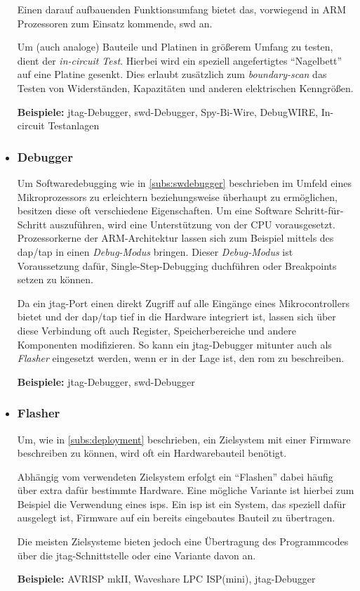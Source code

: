 \begin{itemize}
  Einen darauf aufbauenden Funktionsumfang bietet das, vorwiegend in ARM
  Prozessoren zum Einsatz kommende, \gls{swd}\cite{SWD} an.
  
  Um (auch analoge) Bauteile und Platinen in größerem Umfang zu testen, dient
  der \emph{in-circuit Test}. Hierbei wird ein speziell angefertigtes
  "`Nagelbett"' auf eine Platine gesenkt. Dies erlaubt zusätzlich zum
  \emph{boundary-scan} das Testen von Widerständen, Kapazitäten und anderen
  elektrischen Kenngrößen.
   
  \textbf{Beispiele:} \gls{jtag}-Debugger, \gls{swd}-Debugger, Spy-Bi-Wire,
  DebugWIRE, In-circuit Testanlagen
  \item \subsubsection*{Debugger}\label{subs:hwdebugger}  Um
  Softwaredebugging wie in \autoref{subs:swdebugger} beschrieben im Umfeld eines
  Mikroprozessors zu erleichtern beziehungsweise überhaupt zu ermöglichen,
  besitzen diese oft verschiedene Eigenschaften.
  Um eine Software Schritt-für-Schritt auszuführen, wird eine Unterstützung von
  der CPU vorausgesetzt. Prozessorkerne der ARM-Architektur lassen sich
  zum Beispiel mittels des \gls{dap}/\gls{tap} in einen \emph{Debug-Modus}
  bringen. Dieser \emph{Debug-Modus} ist Voraussetzung dafür,
  Single-Step-Debugging duchführen oder Breakpoints setzen zu können.
  
  Da ein \gls{jtag}-Port einen direkt Zugriff auf alle Eingänge eines
  Mikrocontrollers bietet und der \gls{dap}/\gls{tap} tief in die Hardware
  integriert ist, lassen sich über diese Verbindung oft auch Register,
  Speicherbereiche und andere Komponenten modifizieren. So kann ein
  \gls{jtag}-Debugger mitunter auch als \emph{Flasher} eingesetzt werden, wenn
  er in der Lage ist, den \gls{rom} zu beschreiben.
  
  \textbf{Beispiele:} \gls{jtag}-Debugger, \gls{swd}-Debugger
  \item \subsubsection*{Flasher} Um, wie in \autoref{subs:deployment}
  beschrieben, ein Zielsystem mit einer Firmware beschreiben zu können, wird
  oft ein Hardwarebauteil benötigt.
  
  Abhängig vom verwendeten Zielsystem erfolgt ein "`Flashen"' dabei häufig über
  extra dafür bestimmte Hardware. Eine mögliche Variante ist hierbei zum
  Beispiel die Verwendung eines \glspl{isp}. Ein \gls{isp} ist ein System, das
  speziell dafür ausgelegt ist, Firmware auf ein bereits eingebautes Bauteil zu
  übertragen.
  
  Die meisten Zielsysteme bieten jedoch eine Übertragung des Programmcodes über
  die \gls{jtag}-Schnittstelle oder eine Variante davon an.

  \textbf{Beispiele:} AVRISP mkII, Waveshare LPC ISP(mini), \gls{jtag}-Debugger
\end{itemize}
